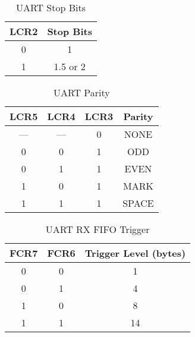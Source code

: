 \begin{table}[h]
    \begin{center}
        \begin{tabular}{|c|c|} \hline
            LCR2 & Stop Bits \\ \hline\hline
            0 & 1 \\ \hline
            1 & 1.5 or 2 \\ \hline
        \end{tabular}
    \end{center}
    \caption{UART Stop Bits}
    \label{tab:uart_stop}
\end{table}

\begin{table}[h]
    \begin{center}
        \begin{tabular}{|c|c|c|c|} \hline
            LCR5 & LCR4 & LCR3 & Parity \\ \hline\hline
            --- & --- & 0 & NONE \\ \hline
            0 & 0 & 1 & ODD \\ \hline
            0 & 1 & 1 & EVEN \\ \hline
            1 & 0 & 1 & MARK \\ \hline
            1 & 1 & 1 & SPACE \\ \hline
        \end{tabular}
    \end{center}
    \caption{UART Parity}
    \label{tab:uart_parity}
\end{table}

\begin{table}[h]
    \begin{center}
        \begin{tabular}{|c|c|c|} \hline
            FCR7 & FCR6 & Trigger Level (bytes) \\ \hline\hline
            0 & 0 & 1 \\ \hline
            0 & 1 & 4 \\ \hline
            1 & 0 & 8 \\ \hline
            1 & 1 & 14 \\ \hline
        \end{tabular}
    \end{center}
    \caption{UART RX FIFO Trigger}
    \label{tab:uart_rx_trig}
\end{table}

